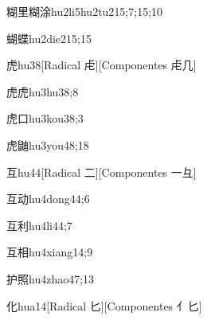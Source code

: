 \begin{verbete}{糊里糊涂}{hu2li5hu2tu2}{15;7;15;10}
\end{verbete}

\begin{verbete}{蝴蝶}{hu2die2}{15;15}
\end{verbete}

\begin{verbete}{虎}{hu3}{8}[Radical ⾌][Componentes ⾌几]
\end{verbete}

\begin{verbete}{虎虎}{hu3hu3}{8;8}
\end{verbete}

\begin{verbete}{虎口}{hu3kou3}{8;3}
\end{verbete}

\begin{verbete}{虎鼬}{hu3you4}{8;18}
\end{verbete}

\begin{verbete}{互}{hu4}{4}[Radical ⼆][Componentes ⼀⺔]
\end{verbete}

\begin{verbete}{互动}{hu4dong4}{4;6}
\end{verbete}

\begin{verbete}{互利}{hu4li4}{4;7}
\end{verbete}

\begin{verbete}{互相}{hu4xiang1}{4;9}
\end{verbete}

\begin{verbete}{护照}{hu4zhao4}{7;13}
\end{verbete}

\begin{verbete}{化}{hua1}{4}[Radical 匕][Componentes 亻匕]
\end{verbete}

